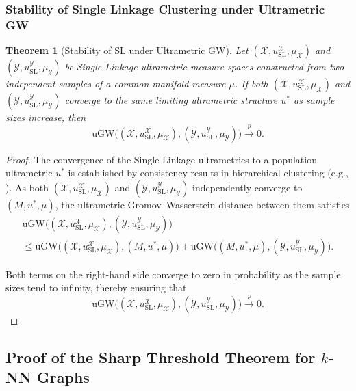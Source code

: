 \documentclass{article}
\theoremstyle{plain}
\newtheorem{theorem}{Theorem}[section]
\theoremstyle{definition}
\theoremstyle{remark}
\begin{document}
\subsubsection{Stability of Single Linkage Clustering under Ultrametric GW}

\begin{theorem}[Stability of SL under Ultrametric GW]
\label{thm:SL-stability}
Let $(\mathcal{X}, u_{\mathrm{SL}}^\mathcal{X}, \mu_\mathcal{X})$ and $(\mathcal{Y}, u_{\mathrm{SL}}^\mathcal{Y}, \mu_\mathcal{Y})$ be Single Linkage ultrametric measure spaces constructed from two independent samples of a common manifold measure $\mu$. If both $(\mathcal{X}, u_{\mathrm{SL}}^\mathcal{X}, \mu_\mathcal{X})$ and $(\mathcal{Y}, u_{\mathrm{SL}}^\mathcal{Y}, \mu_\mathcal{Y})$ converge to the same limiting ultrametric structure $u^*$ as sample sizes increase, then
$$
\mathrm{uGW}\big((\mathcal{X}, u_{\mathrm{SL}}^\mathcal{X}, \mu_\mathcal{X}), (\mathcal{Y}, u_{\mathrm{SL}}^\mathcal{Y}, \mu_\mathcal{Y})\big) \xrightarrow{p} 0.
$$
\end{theorem}

\begin{proof}
The convergence of the Single Linkage ultrametrics to a population ultrametric $u^*$ is established by consistency results in hierarchical clustering (e.g., \cite{chaudhuriConsistentProceduresCluster2014}). As both $(\mathcal{X}, u_{\mathrm{SL}}^\mathcal{X}, \mu_\mathcal{X})$ and $(\mathcal{Y}, u_{\mathrm{SL}}^\mathcal{Y}, \mu_\mathcal{Y})$ independently converge to $(M, u^*, \mu)$, the ultrametric Gromov--Wasserstein distance between them satisfies
\begin{multline*}
    \mathrm{uGW}\big((\mathcal{X}, u_{\mathrm{SL}}^\mathcal{X}, \mu_\mathcal{X}), (\mathcal{Y}, u_{\mathrm{SL}}^\mathcal{Y}, \mu_\mathcal{Y})\big) \\ \leq \mathrm{uGW}\big((\mathcal{X}, u_{\mathrm{SL}}^\mathcal{X}, \mu_\mathcal{X}), (M, u^*, \mu)\big) + \mathrm{uGW}\big((M, u^*, \mu), (\mathcal{Y}, u_{\mathrm{SL}}^\mathcal{Y}, \mu_\mathcal{Y})\big).
\end{multline*}

Both terms on the right-hand side converge to zero in probability as the sample sizes tend to infinity, thereby ensuring that
$$
\mathrm{uGW}\big((\mathcal{X}, u_{\mathrm{SL}}^\mathcal{X}, \mu_\mathcal{X}), (\mathcal{Y}, u_{\mathrm{SL}}^\mathcal{Y}, \mu_\mathcal{Y})\big) \xrightarrow{p} 0.
$$
\end{proof}

\subsection{Proof of the Sharp Threshold Theorem for \texorpdfstring{$k$}{k}-NN Graphs}
\label{app:knn-threshold-proof}
\end{document}
